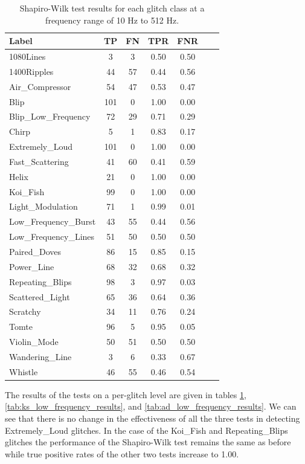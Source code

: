 \documentclass[12pt]{article}
\begin{document}
\begin{table}[H]
  \centering
  \begin{tabular}{lcccccc}
  \toprule
  Label & TP & FN & TPR & FNR \\
  \midrule
  1080Lines & 3 & 3 & 0.50 & 0.50 \\
  1400Ripples & 44 & 57 & 0.44 & 0.56 \\
  Air\_Compressor & 54 & 47 & 0.53 & 0.47 \\
  Blip & 101 & 0 & 1.00 & 0.00 \\
  Blip\_Low\_Frequency & 72 & 29 & 0.71 & 0.29 \\
  Chirp & 5 & 1 & 0.83 & 0.17 \\
  Extremely\_Loud & 101 & 0 & 1.00 & 0.00 \\
  Fast\_Scattering & 41 & 60 & 0.41 & 0.59 \\
  Helix & 21 & 0 & 1.00 & 0.00 \\
  Koi\_Fish & 99 & 0 & 1.00 & 0.00 \\
  Light\_Modulation & 71 & 1 & 0.99 & 0.01 \\
  Low\_Frequency\_Burst & 43 & 55 & 0.44 & 0.56 \\
  Low\_Frequency\_Lines & 51 & 50 & 0.50 & 0.50 \\
  Paired\_Doves & 86 & 15 & 0.85 & 0.15 \\
  Power\_Line & 68 & 32 & 0.68 & 0.32 \\
  Repeating\_Blips & 98 & 3 & 0.97 & 0.03 \\
  Scattered\_Light & 65 & 36 & 0.64 & 0.36 \\
  Scratchy & 34 & 11 & 0.76 & 0.24 \\
  Tomte & 96 & 5 & 0.95 & 0.05 \\
  Violin\_Mode & 50 & 51 & 0.50 & 0.50 \\
  Wandering\_Line & 3 & 6 & 0.33 & 0.67 \\
  Whistle & 46 & 55 & 0.46 & 0.54 \\
  \bottomrule
  \end{tabular}
  \caption{Shapiro-Wilk test results for each glitch class at a frequency range of 10 Hz to 512 Hz.}
  \label{tab:shapiro_low_frequency_results}
\end{table}

\noindent The results of the tests on a per-glitch level are given in tables \ref{tab:shapiro_low_frequency_results}, \ref{tab:ks_low_frequency_results}, and \ref{tab:ad_low_frequency_results}. We can see that there is no change in the effectiveness of all the three tests in detecting Extremely\_Loud glitches. In the case of the Koi\_Fish and Repeating\_Blips glitches the performance of the Shapiro-Wilk test remains the same as before while true positive rates of the other two tests increase to 1.00.
\end{document}
